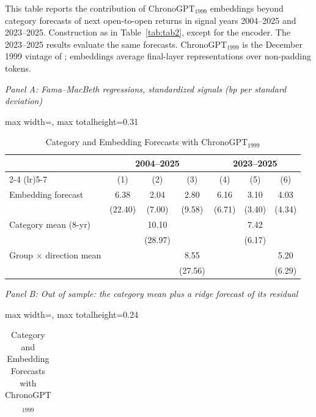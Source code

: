 \begin{table}[htbp]
\centering
\caption{Category and Embedding Forecasts with ChronoGPT$_{1999}$}
\label{tab:tabB_residual}
\begin{minipage}{\linewidth}\footnotesize
This table reports the contribution of ChronoGPT$_{1999}$ embeddings beyond category forecasts of next open-to-open returns in signal years 2004--2025 and 2023--2025. Construction as in Table~\ref{tab:tab2}, except for the encoder. The 2023--2025 results evaluate the same forecasts. ChronoGPT$_{1999}$ is the December 1999 vintage of \citet{he2026chronologically}; embeddings average final-layer representations over non-padding tokens.
\end{minipage}
\medskip

{\footnotesize
\textit{Panel A: Fama--MacBeth regressions, standardized signals (bp per standard deviation)}\\[2pt]
\begin{adjustbox}{max width=\linewidth, max totalheight=0.31\textheight}
\begin{tabular}{lcccccc}
\toprule
 & \multicolumn{3}{c}{2004--2025} & \multicolumn{3}{c}{2023--2025} \\
\cmidrule(lr){2-4} \cmidrule(lr){5-7}
 & (1) & (2) & (3) & (4) & (5) & (6) \\
\midrule
Embedding forecast & \phantom{(0}6.38\phantom{)} & \phantom{(0}2.04\phantom{)} & \phantom{(0}2.80\phantom{)} & \phantom{(}6.16\phantom{)} & \phantom{(}3.10\phantom{)} & \phantom{(}4.03\phantom{)} \\
 & (22.40) & \phantom{0}(7.00) & \phantom{0}(9.58) & (6.71) & (3.40) & (4.34) \\
Category mean (8-yr) &  & \phantom{(}10.10\phantom{)} &  &  & \phantom{(}7.42\phantom{)} &  \\
 &  & (28.97) &  &  & (6.17) &  \\
Group $\times$ direction mean &  &  & \phantom{(0}8.55\phantom{)} &  &  & \phantom{(}5.20\phantom{)} \\
 &  &  & (27.56) &  &  & (6.29) \\
\bottomrule
\end{tabular}
\end{adjustbox}
\par\medskip
\textit{Panel B: Out of sample: the category mean plus a ridge forecast of its residual}\\[2pt]
\begin{adjustbox}{max width=\linewidth, max totalheight=0.24\textheight}
\begin{tabular}{llcccccccc}

\end{tabular}
\end{adjustbox}}
\end{table}
